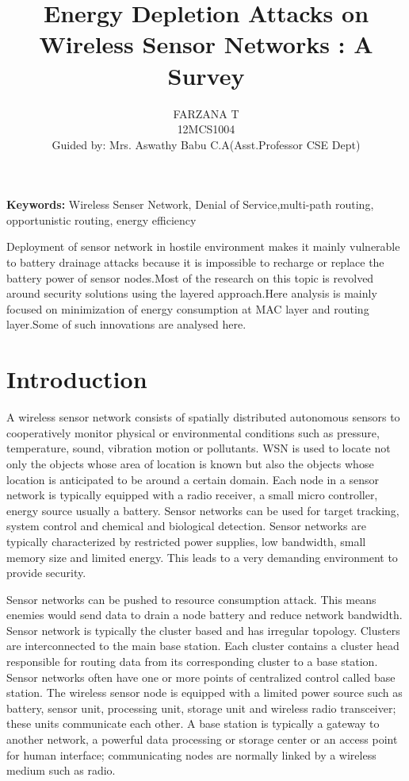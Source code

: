 \documentclass[twocolumn,10pt]{article}
\title{Energy Depletion Attacks on Wireless Sensor Networks : A Survey}
\author{FARZANA T\\12MCS1004\\Guided by: Mrs. Aswathy Babu C.A(Asst.Professor CSE Dept)}
\begin{document}
	
\maketitle
	
{\bf Keywords:}
Wireless Senser Network, Denial of Service,multi-path routing, opportunistic routing, energy efficiency

\abstract{} Deployment of sensor network in hostile environment makes it mainly vulnerable to battery drainage attacks because it is impossible to recharge or replace the battery power of sensor nodes.Most of the research on this topic is revolved around security  solutions using the layered approach.Here analysis is mainly focused on minimization of energy consumption at MAC layer and routing layer.Some of such innovations are analysed here.

\section{\label{reflabel} Introduction}

A wireless sensor network consists of spatially distributed  autonomous sensors to cooperatively monitor physical or  environmental conditions such as pressure, temperature,  sound, vibration motion or pollutants. WSN is used to locate  not only the objects whose area of location is known but also  the objects whose location is anticipated to be around a  certain domain. Each node in a sensor network is typically  equipped with a radio receiver, a small micro controller,  energy source usually a battery. Sensor networks can be used  for target tracking, system control and chemical and  biological detection. Sensor networks are typically  characterized by restricted power supplies, low bandwidth,  small memory size and limited energy.  This leads to a very  demanding environment to provide security.

Sensor networks  can  be pushed to resource consumption attack. This  means enemies would send data to drain a node battery and  reduce network bandwidth. Sensor network is typically the cluster based  and has irregular topology. Clusters are interconnected to the  main base station. Each cluster contains a cluster head  responsible for routing data from its corresponding cluster to  a base station. Sensor networks often have one or more points  of centralized control called base station. The wireless sensor  node is equipped with a limited power source such as battery,  sensor unit, processing unit, storage unit and wireless radio  transceiver; these units communicate each other. A base  station is typically a gateway to another network, a powerful  data processing or storage center or an access point for  human interface; communicating nodes are normally linked  by a wireless medium such as radio. 
\end{document}
